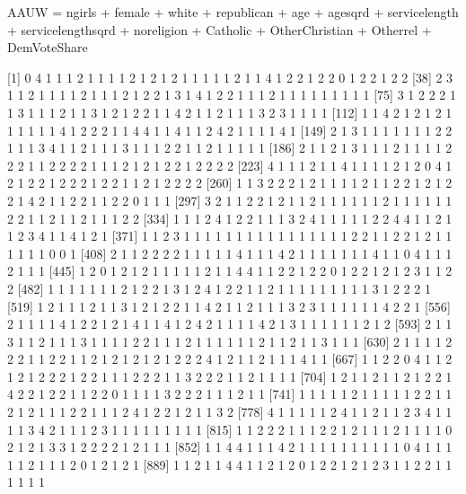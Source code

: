 \documentclass[
]{article}
\newenvironment{Shaded}{\begin{snugshade}}{\end{snugshade}}
\newcommand{\FunctionTok}[1]{\textcolor[rgb]{0.00,0.00,0.00}{#1}}
\newcommand{\NormalTok}[1]{#1}
\newcommand{\SpecialCharTok}[1]{\textcolor[rgb]{0.00,0.00,0.00}{#1}}
\begin{document}
AAUW = ngirls + female + white + republican + age + agesqrd +
servicelength + servicelengthsqrd + noreligion + Catholic +
OtherChristian + Otherrel + DemVoteShare

\begin{Shaded}
\end{Shaded}

{[}1{]} 0 4 1 1 1 2 1 1 1 1 2 1 2 1 2 1 1 1 1 1 2 1 1 4 1 2 2 1 2 2 0 1
2 2 1 2 2 {[}38{]} 2 3 1 1 2 1 1 1 1 2 1 1 1 2 1 2 2 1 3 1 4 1 2 2 1 1 1
2 1 1 1 1 1 1 1 1 1 {[}75{]} 3 1 2 2 2 1 1 3 1 1 1 2 1 1 3 1 2 1 2 2 1 1
4 2 1 1 2 1 1 1 3 2 3 1 1 1 1 {[}112{]} 1 1 4 2 1 2 1 2 1 1 1 1 1 1 4 1
2 2 2 1 1 4 4 1 1 4 1 1 2 4 2 1 1 1 1 4 1 {[}149{]} 2 1 3 1 1 1 1 1 1 1
2 2 1 1 1 3 4 1 1 2 1 1 1 3 1 1 1 2 2 1 1 2 1 1 1 1 1 {[}186{]} 2 1 1 2
1 3 1 1 1 2 1 1 1 1 2 2 2 1 1 2 2 2 2 1 1 1 2 1 2 1 2 2 1 2 2 2 2
{[}223{]} 4 1 1 1 2 1 1 4 1 1 1 1 2 1 2 0 4 1 2 1 2 2 1 2 2 2 1 2 2 1 1
2 1 2 2 2 2 {[}260{]} 1 1 3 2 2 2 1 2 1 1 1 1 2 1 1 2 2 1 2 1 2 2 1 4 2
1 1 2 2 1 1 2 2 0 1 1 1 {[}297{]} 3 2 1 1 2 2 1 2 1 1 2 1 1 1 1 1 1 2 1
1 1 1 1 1 2 2 1 1 2 1 1 2 1 1 1 2 2 {[}334{]} 1 1 1 2 4 1 2 2 1 1 1 3 2
4 1 1 1 1 1 2 2 4 4 1 1 2 1 1 2 3 4 1 1 4 1 2 1 {[}371{]} 1 1 2 3 1 1 1
1 1 1 1 1 1 1 1 1 1 1 1 1 2 2 1 1 2 2 1 2 1 1 1 1 1 1 0 0 1 {[}408{]} 2
1 1 2 2 2 2 1 1 1 1 1 4 1 1 1 4 2 1 1 1 1 1 1 1 4 1 1 0 4 1 1 1 2 1 1 1
{[}445{]} 1 2 0 1 2 1 2 1 1 1 1 1 2 1 1 4 4 1 1 2 2 1 2 2 0 1 2 2 1 2 1
2 3 1 1 2 2 {[}482{]} 1 1 1 1 1 1 1 2 1 2 2 1 3 1 2 4 1 2 2 1 1 2 1 1 1
1 1 1 1 1 1 3 1 2 2 2 1 {[}519{]} 1 2 1 1 1 2 1 1 3 1 2 1 2 2 1 1 4 2 1
1 2 1 1 1 3 2 3 1 1 1 1 1 1 4 2 2 1 {[}556{]} 2 1 1 1 1 4 1 2 2 1 2 1 4
1 1 4 1 2 4 2 1 1 1 1 4 2 1 3 1 1 1 1 1 1 2 1 2 {[}593{]} 2 1 1 3 1 1 2
1 1 1 3 1 1 1 1 2 2 1 1 1 2 1 1 1 1 1 1 2 1 1 2 1 1 3 1 1 1 {[}630{]} 2
1 1 1 1 2 2 2 1 1 2 2 1 1 2 1 2 1 2 1 2 1 2 2 2 4 1 2 1 1 2 1 1 1 4 1 1
{[}667{]} 1 1 2 2 0 4 1 1 2 1 2 1 2 2 2 1 2 2 1 1 1 2 2 2 1 1 3 2 2 2 1
1 2 1 1 1 1 {[}704{]} 1 2 1 1 2 1 1 2 1 2 2 1 4 2 2 1 2 2 1 1 2 2 0 1 1
1 1 3 2 2 2 1 1 1 2 1 1 {[}741{]} 1 1 1 1 1 2 1 1 1 1 1 2 2 1 1 2 1 2 1
1 1 2 2 1 1 1 2 4 1 2 2 1 2 1 1 3 2 {[}778{]} 4 1 1 1 1 1 2 4 1 1 2 1 1
2 3 4 1 1 1 1 3 4 2 1 1 1 2 3 1 1 1 1 1 1 1 1 1 {[}815{]} 1 1 2 2 2 1 1
1 2 2 1 2 1 1 1 2 1 1 1 1 0 2 1 2 1 3 3 1 2 2 2 2 1 2 1 1 1 {[}852{]} 1
1 4 4 1 1 1 4 2 1 1 1 1 1 1 1 1 1 1 0 4 1 1 1 1 1 2 1 1 1 2 0 1 2 1 2 1
{[}889{]} 1 1 2 1 1 4 4 1 1 2 1 2 0 1 2 2 1 2 1 2 3 1 1 2 2 1 1 1 1 1 1
\end{document}
